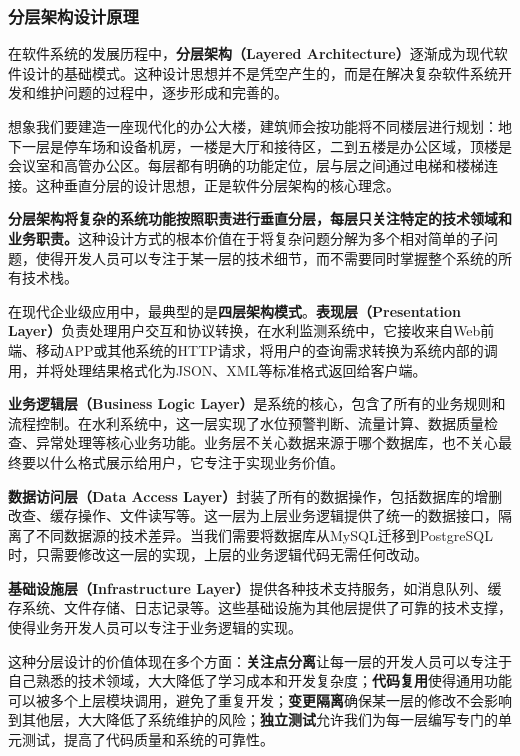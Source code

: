 \subsubsection{分层架构设计原理}\label{ux5206ux5c42ux67b6ux6784ux8bbeux8ba1ux539fux7406}

在软件系统的发展历程中，\textbf{分层架构（Layered Architecture）}逐渐成为现代软件设计的基础模式。这种设计思想并不是凭空产生的，而是在解决复杂软件系统开发和维护问题的过程中，逐步形成和完善的。

想象我们要建造一座现代化的办公大楼，建筑师会按功能将不同楼层进行规划：地下一层是停车场和设备机房，一楼是大厅和接待区，二到五楼是办公区域，顶楼是会议室和高管办公区。每层都有明确的功能定位，层与层之间通过电梯和楼梯连接。这种垂直分层的设计思想，正是软件分层架构的核心理念。

\textbf{分层架构将复杂的系统功能按照职责进行垂直分层，每层只关注特定的技术领域和业务职责。}这种设计方式的根本价值在于将复杂问题分解为多个相对简单的子问题，使得开发人员可以专注于某一层的技术细节，而不需要同时掌握整个系统的所有技术栈。

在现代企业级应用中，最典型的是\textbf{四层架构模式}。\textbf{表现层（Presentation Layer）}负责处理用户交互和协议转换，在水利监测系统中，它接收来自Web前端、移动APP或其他系统的HTTP请求，将用户的查询需求转换为系统内部的调用，并将处理结果格式化为JSON、XML等标准格式返回给客户端。

\textbf{业务逻辑层（Business Logic Layer）}是系统的核心，包含了所有的业务规则和流程控制。在水利系统中，这一层实现了水位预警判断、流量计算、数据质量检查、异常处理等核心业务功能。业务层不关心数据来源于哪个数据库，也不关心最终要以什么格式展示给用户，它专注于实现业务价值。

\textbf{数据访问层（Data Access Layer）}封装了所有的数据操作，包括数据库的增删改查、缓存操作、文件读写等。这一层为上层业务逻辑提供了统一的数据接口，隔离了不同数据源的技术差异。当我们需要将数据库从MySQL迁移到PostgreSQL时，只需要修改这一层的实现，上层的业务逻辑代码无需任何改动。

\textbf{基础设施层（Infrastructure Layer）}提供各种技术支持服务，如消息队列、缓存系统、文件存储、日志记录等。这些基础设施为其他层提供了可靠的技术支撑，使得业务开发人员可以专注于业务逻辑的实现。

这种分层设计的价值体现在多个方面：\textbf{关注点分离}让每一层的开发人员可以专注于自己熟悉的技术领域，大大降低了学习成本和开发复杂度；\textbf{代码复用}使得通用功能可以被多个上层模块调用，避免了重复开发；\textbf{变更隔离}确保某一层的修改不会影响到其他层，大大降低了系统维护的风险；\textbf{独立测试}允许我们为每一层编写专门的单元测试，提高了代码质量和系统的可靠性。

